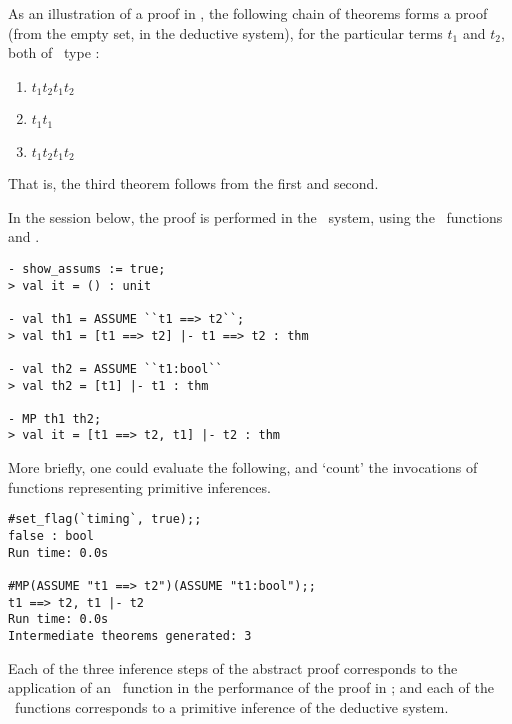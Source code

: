 As an illustration of a proof in \HOL{}, the following chain of
theorems forms a proof (from the empty set, in the \HOL{} deductive
system), for the particular terms $t_1$
and $t_2$,
both of \HOL\ type :

\begin{enumerate}
\item $t_1$\ml{ ==> }$t_2$\ml{ |- }$t_1$\ml{ ==> }$t_2$

\item $t_1$\ml{ |- }$t_1$

\item $t_1$\ml{ ==> }$t_2$\ml{, }$t_1$\ml{ |- }$t_2$
\end{enumerate}

\noindent That is, the third theorem follows from the first and second.

In the session below, the proof is performed in the \HOL\ system,
using the \ML\ functions  and
.

\setcounter{sessioncount}{1}
\begin{session}
\begin{verbatim}
- show_assums := true;
> val it = () : unit

- val th1 = ASSUME ``t1 ==> t2``;
> val th1 = [t1 ==> t2] |- t1 ==> t2 : thm

- val th2 = ASSUME ``t1:bool``
> val th2 = [t1] |- t1 : thm

- MP th1 th2;
> val it = [t1 ==> t2, t1] |- t2 : thm
\end{verbatim}
\end{session}

\noindent More briefly, one could evaluate the following, and `count' the
invocations of functions representing primitive inferences.

\begin{session}
\begin{verbatim}
#set_flag(`timing`, true);;
false : bool
Run time: 0.0s

#MP(ASSUME "t1 ==> t2")(ASSUME "t1:bool");;
t1 ==> t2, t1 |- t2
Run time: 0.0s
Intermediate theorems generated: 3
\end{verbatim}
\end{session}

\noindent Each of the three inference steps of the abstract proof
corresponds to the application
%
%
%
%
%
of an \ML\ function in the performance of the proof in \HOL; and each
of the \ML\ functions corresponds to a primitive inference of the
deductive system.

